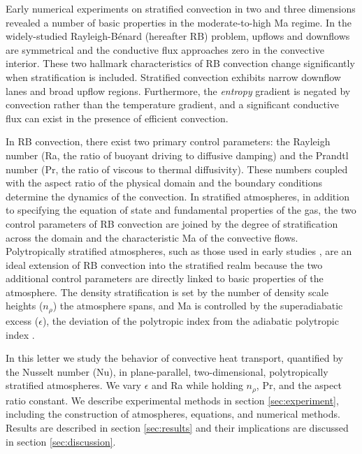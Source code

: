 \documentclass[aps, prl, twocolumn, nofootinbib, groupedaddress, amsfonts, amssymb, amsmath]{revtex4-1}
\newcommand{\RB}{Rayleigh-B\'{e}nard }
\newcommand{\nrho}{\ensuremath{n_{\rho}}}
\begin{document}
Early numerical experiments on stratified convection
in two \cite{graham1975, chan&all1982,
hurlburt&all1984, cattaneo&all1990} and three 
\cite{cattaneo&all1991, brummell&all1996} dimensions
revealed a number of basic properties in the moderate-to-high 
Ma regime. In the widely-studied \RB (hereafter RB) problem, 
upflows and downflows are symmetrical and
the conductive flux approaches zero in the convective interior.
These two hallmark characteristics of RB convection change
significantly when stratification is included.  Stratified convection 
exhibits narrow downflow lanes and broad upflow regions.
Furthermore, the \emph{entropy} gradient is negated by convection 
rather than the temperature gradient, and
a significant conductive flux can exist in the presence of
efficient convection.

In RB convection, there exist two primary control parameters: 
the Rayleigh number (Ra, the ratio of
buoyant driving to diffusive damping) and the Prandtl number 
(Pr, the ratio of viscous to thermal
diffusivity).  These numbers coupled with the aspect ratio of 
the physical domain and the boundary conditions
determine the dynamics of the convection.  In stratified atmospheres, 
in addition to specifying the equation of state and
fundamental properties of the gas, the two control parameters of 
RB convection are joined by the degree of
stratification across the domain and the characteristic 
Ma of the convective flows.  
Polytropically stratified atmospheres, such as those used in 
early studies \cite{graham1975, chan&all1982, hurlburt&all1984, 
cattaneo&all1990, cattaneo&all1991, brummell&all1996}, are an ideal extension of
RB convection into the stratified realm because the two additional 
control parameters are directly linked to
basic properties of the atmosphere.  The density stratification is 
set by the number of density scale heights (\nrho)
the atmosphere spans, and Ma is controlled 
by the superadiabatic excess ($\epsilon$),
the deviation of the polytropic index from the adiabatic polytropic 
index \cite{graham1975}.

In this letter we study the behavior of convective heat transport, 
quantified by the Nusselt number (Nu), in plane-parallel, 
two-dimensional, polytropically stratified atmospheres.  
We vary $\epsilon$ and Ra while holding $\nrho$, Pr, and the aspect ratio
constant.  We describe experimental methods in section 
\ref{sec:experiment}, including the construction of atmospheres, equations, and numerical methods.  
Results are described in section \ref{sec:results} and their implications are discussed
in section \ref{sec:discussion}.
\end{document}
